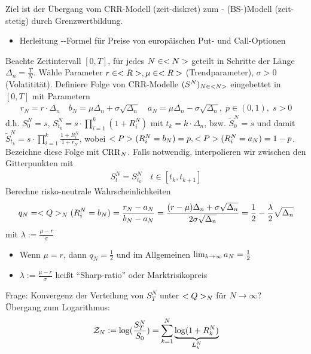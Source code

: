 ﻿Ziel ist der Übergang vom CRR-Modell (zeit-diskret) zum - (BS-)Modell (zeit-stetig) durch Grenzwertbildung.
\begin{itemize}
	\item Herleitung --Formel für Preise von europäischen Put- und Call-Optionen
\end{itemize}
Beachte Zeitintervall $[0,T]$, für jedes $N \in \N$ geteilt in Schritte der Länge $\Delta_n = \frac{T}{N}$. Wähle Parameter $r \in \R, \mu \in \R$ (Trendparameter), $\sigma > 0$ (Volatitität). Definiere Folge von CRR-Modelle $(S^N)_{N \in \N}$ eingebettet in $[0,T]$ mit Parametern
\begin{align*}
	r_N = r \cdot \Delta_n \quad b_N = \mu \Delta_n + \sigma \sqrt{\Delta_n}\quad a_N = \mu \Delta_n - \sigma \sqrt{\Delta_n},\;p \in (0,1),\;s> 0
\end{align*}
d.h. $S^N_0 = s$, $S^N_{t_k} = s \cdot \prod_{i=1}^k (1+R_i^N)$ mit $t_k = k \cdot \Delta_n$, bzw. $\tilde{S}_0^N = s$ und damit $\tilde{S}^N_{t_k}= s \cdot \prod_{i=1}^k \frac{1+R_i^N}{1+r_N}$, wobei $\P(R^N_i = b_N) = p, \P(R^N_i = a_N) = 1-p$.
Bezeichne diese Folge mit $\CRR_N$. Falls notwendig, interpolieren wir zwischen den Gitterpunkten mit
\begin{align*}
	S_t^N = S^N_{t_k} \quad t \in [t_k,t_{k+1}]
\end{align*}
Berechne risko-neutrale Wahrscheinlichkeiten
\begin{align*}
	q_N = \QQ_N(R_i^N = b_N) = \frac{r_N - a_N}{b_N - a_N} = \frac{(r-\mu)\Delta_n + \sigma \sqrt{\Delta_n}}{2\sigma\sqrt{\Delta_n}} = \frac{1}{2} - \frac{\lambda}{2}\sqrt{\Delta_n}
\end{align*}
mit $\lambda := \frac{\mu - r}{\sigma}$
\begin{*remark}
	\begin{itemize}
		\item Wenn $\mu = r$, dann $q_N = \frac{1}{2}$ und im Allgemeinen $\lim_{k \to \infty}a_N = \half$
		\item $\lambda := \frac{\mu - r}{\sigma}$ heißt ``Sharp-ratio'' oder Marktrisikopreis
	\end{itemize}
\end{*remark}
Frage: Konvergenz der Verteilung von $S^N_T$ unter $\QQ_N$ für $N \to \infty$?\\
Übergang zum Logarithmus:
\begin{align*}
	\ZZ_N := \log(\frac{S^N_T}{S_0}) = \sum_{k=1}^N \underbrace{\log(1+R_k^N)}_{L^N_k}
\end{align*}
